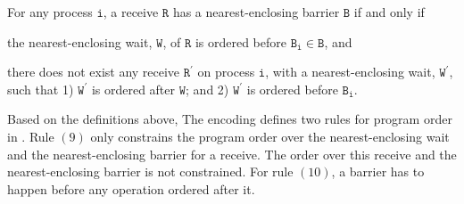 \begin{definition}\label{def:nb}
For any process $\mathtt{i}$, a receive $\mathtt{R}$ has a nearest-enclosing barrier $\mathtt{B}$ if and only if
\begin{compactenum}
\item the nearest-enclosing wait, $\mathtt{W}$, of $\mathtt{R}$ is ordered before $\mathtt{B_i}\in \mathtt{B}$, and
\item there does not exist any receive $\mathtt{R^\prime}$ on process $\mathtt{i}$, with a nearest-enclosing wait, $\mathtt{W^\prime}$, such that 1) $\mathtt{W^\prime}$ is ordered after $\mathtt{W}$; and 2) $\mathtt{W^\prime}$ is ordered before $\mathtt{B_i}$.
\end{compactenum}
\end{definition}

Based on the definitions above, The encoding defines two rules for program order in . Rule $(9)$ only constrains the program order over the nearest-enclosing wait and the nearest-enclosing barrier for a receive. The order over this receive and the nearest-enclosing barrier is not constrained. For rule $(10)$, a barrier has to happen before any operation ordered after it. 



\encodingcc

